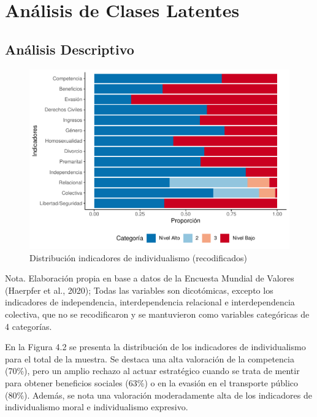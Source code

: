 \documentclass[12pt,twoside]{templates/facsothesis}
\begin{document}
\hypertarget{anuxe1lisis-de-clases-latentes-1}{%
\section{Análisis de Clases Latentes}\label{anuxe1lisis-de-clases-latentes-1}}

\hypertarget{anuxe1lisis-descriptivo-1}{%
\subsection*{Análisis Descriptivo}\label{anuxe1lisis-descriptivo-1}}

\begin{figure}[!ht]

{\centering \includegraphics[width=1\linewidth,]{tesis_files/figure-latex/unnamed-chunk-8-1} 

}

\caption{Distribución indicadores de individualismo (recodificados)}\label{fig:unnamed-chunk-8}
\end{figure}
\FloatBarrier

Nota. Elaboración propia en base a datos de la Encuesta Mundial de Valores (Haerpfer et al., 2020); Todas las variables son dicotómicas, excepto los indicadores de independencia, interdependencia relacional e interdependencia colectiva, que no se recodificaron y se mantuvieron como variables categóricas de 4 categorías.

En la Figura 4.2 se presenta la distribución de los indicadores de individualismo para el total de la muestra. Se destaca una alta valoración de la competencia (70\%), pero un amplio rechazo al actuar estratégico cuando se trata de mentir para obtener beneficios sociales (63\%) o en la evasión en el transporte público (80\%). Además, se nota una valoración moderadamente alta de los indicadores de individualismo moral e individualismo expresivo.
\end{document}
